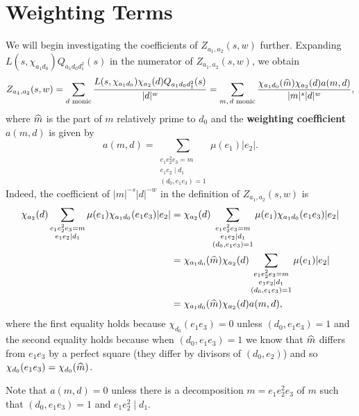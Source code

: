 \documentclass[12pt,reqno,oneside]{amsart}
\begin{document}
\section{Weighting Terms}
    We will begin investigating the coefficients of $Z_{a_{1},a_{2}}(s,w)$ further. Expanding $L(s,\chi_{a_{1}d_{0}})Q_{a_{1}d_{0}d_{1}^{2}}(s)$ in the numerator of $Z_{a_{1},a_{2}}(s,w)$, we obtain
    \[
        Z_{a_{1},a_{2}}(s,w) = \sum_{\text{$d$ monic}}\frac{L(s,\chi_{a_{1}d_{0}})\chi_{a_{2}}(d)Q_{a_{1}d_{0}d_{1}^{2}}(s)}{|d|^{w}} = \sum_{\text{$m,d$ monic}}\frac{\chi_{a_{1}d_{0}}(\widehat{m})\chi_{a_{2}}(d)a(m,d)}{|m|^{s}|d|^{w}},
    \]
    where $\widehat{m}$ is the part of $m$ relatively prime to $d_{0}$ and the \textbf{weighting coefficient} $a(m,d)$ is given by
    \[
        a(m,d) = \sum_{\substack{e_{1}e_{2}^{2}e_{3} = m \\ e_{1}e_{2} \mid d_{1} \\ (d_{0},e_{1}e_{3}) = 1}}\mu(e_{1})|e_{2}|.
    \]
    Indeed, the coefficient of $|m|^{-s}|d|^{-w}$ in the definition of $Z_{a_{1},a_{2}}(s,w)$ is
    \begin{align*}
        \chi_{a_{2}}(d)\sum_{\substack{e_{1}e_{2}^{2}e_{3} = m \\ e_{1}e_{2} \mid d_{1}}}\mu(e_{1})\chi_{a_{1}d_{0}}(e_{1}e_{3})|e_{2}| &= \chi_{a_{2}}(d)\sum_{\substack{e_{1}e_{2}^{2}e_{3} = m \\ e_{1}e_{2} \mid d_{1} \\ (d_{0},e_{1}e_{3}) = 1}}\mu(e_{1})\chi_{a_{1}d_{0}}(e_{1}e_{3})|e_{2}| \\
        &= \chi_{a_{1}d_{0}}(\widehat{m})\chi_{a_{2}}(d)\sum_{\substack{e_{1}e_{2}^{2}e_{3} = m \\ e_{1}e_{2} \mid d_{1} \\ (d_{0},e_{1}e_{3}) = 1}}\mu(e_{1})|e_{2}| \\
        &= \chi_{a_{1}d_{0}}(\widehat{m})\chi_{a_{2}}(d)a(m,d),
    \end{align*}
    where the first equality holds because $\chi_{d_{0}}(e_{1}e_{3}) = 0$ unless $(d_{0},e_{1}e_{3}) = 1$ and the second equality holds because when $(d_{0},e_{1}e_{3}) = 1$ we know that $\widehat{m}$ differs from $e_{1}e_{3}$ by a perfect square (they differ by divisors of $(d_{0},e_{2})$) and so $\chi_{d_{0}}(e_{1}e_{3}) = \chi_{d_{0}}(\widehat{m})$. 
    
    \begin{remark}\label{rem:weighting_coefficient_remark}
        Note that $a(m,d) = 0$ unless there is a decomposition $m = e_{1}e_{2}^{2}e_{3}$ of $m$ such that $(d_{0},e_{1}e_{3}) = 1$ and $e_{1}e_{2}^{2} \mid d_{1}$.
    \end{remark}
\end{document}
